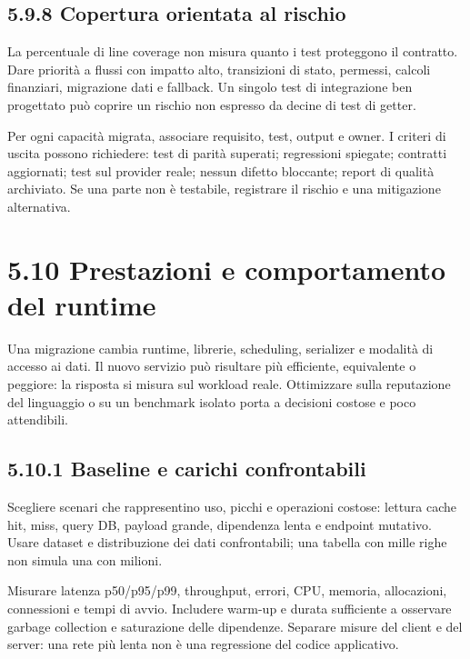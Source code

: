 \documentclass[
  italian,
  10pt,
]{book}
\begin{document}
\subsection{5.9.8 Copertura orientata al
rischio}\label{copertura-orientata-al-rischio}

La percentuale di line coverage non misura quanto i test proteggono il
contratto. Dare priorità a flussi con impatto alto, transizioni di
stato, permessi, calcoli finanziari, migrazione dati e fallback. Un
singolo test di integrazione ben progettato può coprire un rischio non
espresso da decine di test di getter.

Per ogni capacità migrata, associare requisito, test, output e owner. I
criteri di uscita possono richiedere: test di parità superati;
regressioni spiegate; contratti aggiornati; test sul provider reale;
nessun difetto bloccante; report di qualità archiviato. Se una parte non
è testabile, registrare il rischio e una mitigazione alternativa.

\section{5.10 Prestazioni e comportamento del
runtime}\label{prestazioni-e-comportamento-del-runtime}

Una migrazione cambia runtime, librerie, scheduling, serializer e
modalità di accesso ai dati. Il nuovo servizio può risultare più
efficiente, equivalente o peggiore: la risposta si misura sul workload
reale. Ottimizzare sulla reputazione del linguaggio o su un benchmark
isolato porta a decisioni costose e poco attendibili.

\subsection{5.10.1 Baseline e carichi
confrontabili}\label{baseline-e-carichi-confrontabili}

Scegliere scenari che rappresentino uso, picchi e operazioni costose:
lettura cache hit, miss, query DB, payload grande, dipendenza lenta e
endpoint mutativo. Usare dataset e distribuzione dei dati confrontabili;
una tabella con mille righe non simula una con milioni.

Misurare latenza p50/p95/p99, throughput, errori, CPU, memoria,
allocazioni, connessioni e tempi di avvio. Includere warm-up e durata
sufficiente a osservare garbage collection e saturazione delle
dipendenze. Separare misure del client e del server: una rete più lenta
non è una regressione del codice applicativo.
\end{document}
